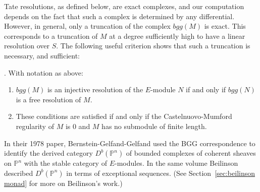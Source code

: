 \documentclass[twoside,12pt, leqno]{amsart}
\def\PP{{\mathbb P}}
\def\CU{{\mathcal U}}
\def\daniel#1{{\bf *** Daniel:} #1 {\bf ***}}
\begin{document}
Tate resolutions, as defined below, are exact complexes, and our computation depends on the fact that such a complex is
determined by any differential. However, in general, only a truncation of the complex $bgg(M)$ is exact. This corresponds to a truncation of $M$ at a degree sufficiently high to have a linear resolution over $S$. The following useful criterion shows that such a truncation is necessary, and sufficient:

\begin{theorem}[Reciprocity] \cite[Theorem 3.7 and Corollary 2.4] {EFS}\label{Reciprocity}. With notation as above:
\begin{enumerate}
 \item $bgg(M)$ is an injective resolution of the $E$-module $N$ if and only if
$bgg(N)$ is a free resolution of $M$.

\item These conditions are satisfied if and only if the Castelnuovo-Mumford regularity of $M$ is 0 and $M$ has no submodule of finite length.
\end{enumerate}
\end{theorem}


In their 1978 paper, Bernstein-Gelfand-Gelfand \cite{BGG} used the BGG correspondence to identify  the derived category $D^b(\PP^n)$ of bounded complexes of coherent sheaves on $\PP^n$ with the stable category of $E$-modules. In the same volume \cite{beilinson} Beilinson described
$D^b(\PP^n)$ in terms of exceptional sequences.  (See Section~\ref{sec:beilinson monad} for more on Beilinson's work.)

\end{document}
